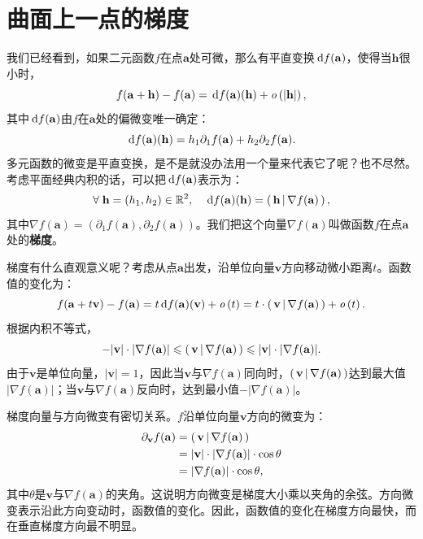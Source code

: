 \documentclass[12pt,UTF8]{ctexbook}
\begin{document}
\section{曲面上一点的梯度}
我们已经看到，如果二元函数$f$在点$\mathbf{a}$处可微，那么有平直变换$\,\mathrm{d} f(\mathbf{a})$，使得当$\mathbf{h}$很小时，
$$ f(\mathbf{a} + \mathbf{h}) - f(\mathbf{a}) = \,\mathrm{d} f(\mathbf{a})(\mathbf{h}) + \mathit{o}\left(|\mathbf{h}|\right), $$
其中$\,\mathrm{d} f(\mathbf{a})$由$f$在$\mathbf{a}$处的偏微变唯一确定：
$$ \,\mathrm{d} f(\mathbf{a})(\mathbf{h}) = h_1 \partial_1 f(\mathbf{a}) + h_2 \partial_2 f(\mathbf{a}). $$
多元函数的微变是平直变换，是不是就没办法用一个量来代表它了呢？也不尽然。考虑平面经典内积的话，可以把$\,\mathrm{d} f(\mathbf{a})$表示为：
$$ \forall\; \mathbf{h} = (h_1, h_2)\in \mathbb{R}^2, \quad \,\mathrm{d} f(\mathbf{a})(\mathbf{h}) = \displaystyle\left( \,\mathbf{h} \,\middle\vert \,\nabla f(\mathbf{a}) \,\right), $$
其中$\nabla f(\mathbf{a}) = (\partial_1 f(\mathbf{a}), \partial_2 f(\mathbf{a}))$。我们把这个向量$\nabla f(\mathbf{a})$叫做函数$f$在点$\mathbf{a}$处的\textbf{梯度}。

梯度有什么直观意义呢？考虑从点$\mathbf{a}$出发，沿单位向量$\mathbf{v}$方向移动微小距离$t$。函数值的变化为：
$$ f(\mathbf{a} + t \mathbf{v}) - f(\mathbf{a}) = t \,\mathrm{d} f(\mathbf{a})(\mathbf{v}) + \mathit{o}\left(t\right) = t \cdot \displaystyle\left( \,\mathbf{v} \,\middle\vert \,\nabla f(\mathbf{a}) \,\right)  + \mathit{o}\left(t\right). $$
根据内积不等式，
$$ -|\mathbf{v}|\cdot |\nabla f(\mathbf{a})| \leqslant \displaystyle\left( \,\mathbf{v} \,\middle\vert \,\nabla f(\mathbf{a}) \,\right) \leqslant |\mathbf{v}|\cdot |\nabla f(\mathbf{a})|. $$
由于$\mathbf{v}$是单位向量，$|\mathbf{v}| = 1$，因此当$\mathbf{v}$与$\nabla f(\mathbf{a})$同向时，$\displaystyle\left( \,\mathbf{v} \,\middle\vert \,\nabla f(\mathbf{a}) \,\right)$达到最大值$|\nabla f(\mathbf{a})|$；当$\mathbf{v}$与$\nabla f(\mathbf{a})$反向时，达到最小值$-|\nabla f(\mathbf{a})|$。

梯度向量与方向微变有密切关系。$f$沿单位向量$\mathbf{v}$方向的微变为：
\begin{align*}
\partial_{\mathbf{v}} f(\mathbf{a}) &= \displaystyle\left( \,\mathbf{v} \,\middle\vert \,\nabla f(\mathbf{a}) \,\right) \\
&= |\mathbf{v}|\cdot |\nabla f(\mathbf{a})| \cdot \cos\theta \\
&= |\nabla f(\mathbf{a})| \cdot \cos\theta,
\end{align*}
其中$\theta$是$\mathbf{v}$与$\nabla f(\mathbf{a})$的夹角。这说明方向微变是梯度大小乘以夹角的余弦。方向微变表示沿此方向变动时，函数值的变化。因此，函数值的变化在梯度方向最快，而在垂直梯度方向最不明显。
\end{document}
